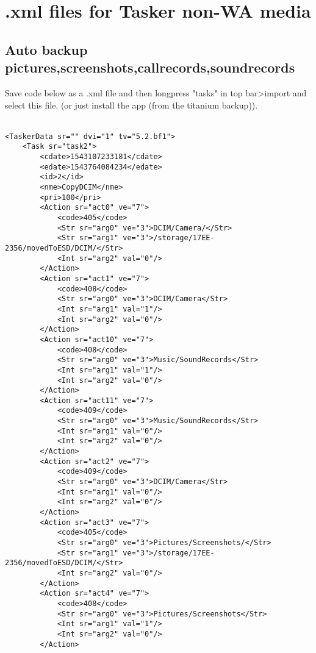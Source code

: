 \section{.xml files for Tasker non-WA media}\label{app:F}
\subsection{Auto backup pictures,screenshots,callrecords,soundrecords}
Save code below as a .xml file and then longpress "tasks" in top bar>import and select this file. (or just install the app (from the titanium backup)). %
\\
\\

\begin{verbatim}
<TaskerData sr="" dvi="1" tv="5.2.bf1">
    <Task sr="task2">
        <cdate>1543107233181</cdate>
        <edate>1543764084234</edate>
        <id>2</id>
        <nme>CopyDCIM</nme>
        <pri>100</pri>
        <Action sr="act0" ve="7">
            <code>405</code>
            <Str sr="arg0" ve="3">DCIM/Camera/</Str>
            <Str sr="arg1" ve="3">/storage/17EE-2356/movedToESD/DCIM/</Str>
            <Int sr="arg2" val="0"/>
        </Action>
        <Action sr="act1" ve="7">
            <code>408</code>
            <Str sr="arg0" ve="3">DCIM/Camera</Str>
            <Int sr="arg1" val="1"/>
            <Int sr="arg2" val="0"/>
        </Action>
        <Action sr="act10" ve="7">
            <code>408</code>
            <Str sr="arg0" ve="3">Music/SoundRecords</Str>
            <Int sr="arg1" val="1"/>
            <Int sr="arg2" val="0"/>
        </Action>
        <Action sr="act11" ve="7">
            <code>409</code>
            <Str sr="arg0" ve="3">Music/SoundRecords</Str>
            <Int sr="arg1" val="0"/>
            <Int sr="arg2" val="0"/>
        </Action>
        <Action sr="act2" ve="7">
            <code>409</code>
            <Str sr="arg0" ve="3">DCIM/Camera</Str>
            <Int sr="arg1" val="0"/>
            <Int sr="arg2" val="0"/>
        </Action>
        <Action sr="act3" ve="7">
            <code>405</code>
            <Str sr="arg0" ve="3">Pictures/Screenshots/</Str>
            <Str sr="arg1" ve="3">/storage/17EE-2356/movedToESD/DCIM/</Str>
            <Int sr="arg2" val="0"/>
        </Action>
        <Action sr="act4" ve="7">
            <code>408</code>
            <Str sr="arg0" ve="3">Pictures/Screenshots</Str>
            <Int sr="arg1" val="1"/>
            <Int sr="arg2" val="0"/>
        </Action>

\end{verbatim}
